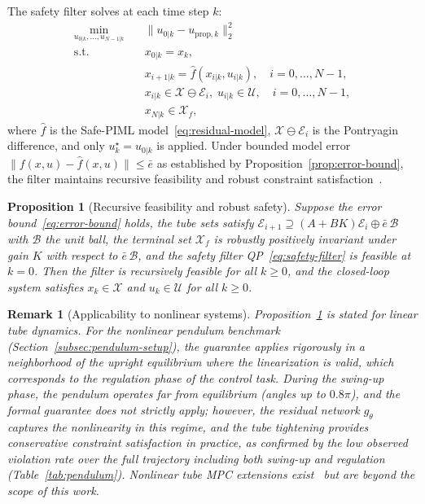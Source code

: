 \documentclass[12pt,a4paper]{article}
\newtheorem{proposition}{Proposition}
\newtheorem{remark}{Remark}
\begin{document}
The safety filter solves at each time step $k$:
\begin{equation}
  \begin{aligned}
  \min_{u_{0|k},\dots,u_{N-1|k}} \quad
    & \bigl\|u_{0|k} - u_{\mathrm{prop},k}\bigr\|_2^2 \\
  \text{s.t.} \quad
    & x_{0|k} = x_k, \\
    & x_{i+1|k} = \hat{f}(x_{i|k}, u_{i|k}),
      \quad i = 0,\dots,N{-}1, \\
    & x_{i|k} \in \mathcal{X} \ominus \mathcal{E}_i,
      \; u_{i|k} \in \mathcal{U},
      \quad i = 0,\dots,N{-}1, \\
    & x_{N|k} \in \mathcal{X}_f,
  \end{aligned}
  \label{eq:safety-filter}
\end{equation}
where $\hat{f}$ is the Safe-PIML model~\eqref{eq:residual-model},
$\mathcal{X} \ominus \mathcal{E}_i$ is the Pontryagin difference, and
only $u_k^\star = u_{0|k}$ is applied. Under bounded model error
$\|f(x,u) - \hat{f}(x,u)\| \leq \bar{e}$ as established by
Proposition~\ref{prop:error-bound}, the filter maintains recursive
feasibility and robust constraint
satisfaction~\cite{mayne2005robust,wabersich2021psf,gao2024rigid}.

\begin{proposition}[Recursive feasibility and robust safety]
\label{prop:safety}
Suppose the error bound~\eqref{eq:error-bound} holds, the tube sets
satisfy
$\mathcal{E}_{i+1} \supseteq (A{+}BK)\mathcal{E}_i \oplus
\bar{e}\,\mathcal{B}$ with $\mathcal{B}$ the unit ball, the terminal
set $\mathcal{X}_f$ is robustly positively invariant under gain $K$
with respect to $\bar{e}\,\mathcal{B}$, and the safety filter
QP~\eqref{eq:safety-filter} is feasible at $k=0$. Then the filter is
recursively feasible for all $k \geq 0$, and the closed-loop system
satisfies $x_k \in \mathcal{X}$ and $u_k \in \mathcal{U}$ for all
$k \geq 0$.
\end{proposition}

\begin{remark}[Applicability to nonlinear systems]
\label{rem:nonlinear}
Proposition~\ref{prop:safety} is stated for linear tube dynamics. For
the nonlinear pendulum benchmark
(Section~\ref{subsec:pendulum-setup}), the guarantee applies rigorously
in a neighborhood of the upright equilibrium where the linearization is
valid, which corresponds to the regulation phase of the control task.
During the swing-up phase, the pendulum operates far from equilibrium
(angles up to $0.8\pi$), and the formal guarantee does not strictly
apply; however, the residual network $g_\theta$ captures the
nonlinearity in this regime, and the tube tightening provides
conservative constraint satisfaction in practice, as confirmed by the
low observed violation rate over the full trajectory including
both swing-up and regulation (Table~\ref{tab:pendulum}). Nonlinear tube MPC extensions
exist~\cite{gao2024rigid} but are beyond the scope of this work.
\end{remark}
\end{document}
